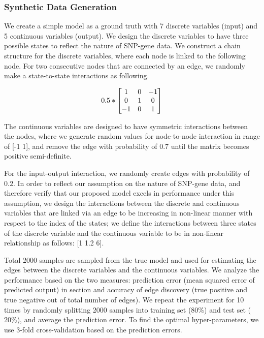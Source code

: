 \documentclass{article}
\begin{document}
\subsubsection{Synthetic Data Generation}
We create a simple model as a ground truth with 7 discrete variables (input) and 5 continuous variables (output).
We design the discrete variables to have three possible states to reflect the nature of SNP-gene data. We construct a chain structure for the discrete variables, where each node is linked to the following node. For two consecutive nodes that are connected by an edge, we randomly make a state-to-state interactions as following.

\begin{align*}
\centering
0.5 * 
\begin{bmatrix}
  1 & 0 & -1 \\
  0 & 1 & 0 \\
  -1 & 0 & 1
\end{bmatrix}
\end{align*}

The continuous variables are designed to have symmetric interactions between the nodes, where we generate random values for node-to-node interaction in range of [-1 1], and remove the edge with probability of $0.7$ until the matrix becomes positive semi-definite.

For the input-output interaction, we randomly create edges with probability of $0.2$. 
In order to reflect our assumption on the nature of SNP-gene data, and therefore verify that our proposed model excels in performance under this assumption, we design the interactions between the discrete and continuous variables that are linked via an edge to be increasing in non-linear manner with respect to the index of the states;
we define the interactions between three states of the discrete variable and the continuous variable to be in non-linear relationship as follows: [1 1.2 6].



 Total 2000 samples are sampled from the true model and used for estimating the edges between the discrete variables and the continuous variables. 
 We analyze the performance based on the two measures: prediction error (mean squared error of predicted output) in section and accuracy of edge discovery (true positive and true negative out of total number of edges). 
We repeat the experiment for 10 times by randomly splitting 2000 samples into training set ($80 \%$) and test set ($20\%$), and average the prediction error.
 To find the optimal hyper-parameters, we use 3-fold cross-validation based on the prediction errors.
 
\end{document}
